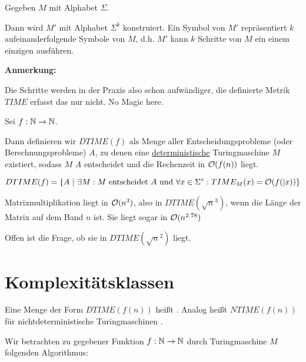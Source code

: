 \begin{beweis}
    Gegeben $M$ mit Alphabet $\Sigma$.

    Dann wird $M'$ mit Alphabet $\Sigma^k$ konstruiert. Ein Symbol von $M'$ repräsentiert $k$ aufeinanderfolgende Symbole von $M$, d.h. $M'$ kann $k$ Schritte von $M$ ein einem einzigen ausführen.
\end{beweis}

\textbf{Anmerkung:}

Die Schritte werden in der Praxis also schon aufwändiger, die definierte Metrik $TIME$ erfasst das nur nicht. No Magic here.



\begin{definition}
    Sei $f: \mathbb{N} \rightarrow \mathbb{N}$. 

    Dann definieren wir $DTIME(f)$ als Menge aller Entscheidungsprobleme (oder Berechnungsprobleme) $A$, zu denen eine \underline{deterministische} Turingmaschine $M$ existiert, sodass $M$ $A$ entscheidet und die Rechenzeit in $\mathcal{O}(f(n))$ liegt.

    $$ DTIME(f) = \{  
        A 
        \ |\ 
        \exists M: 
            M \text{ entscheidet } A
            \text{ und }
            \forall x \in \Sigma^\ast: TIME_M(x) = \bigO(f(|x))
    \}
    $$
\end{definition}

\begin{satz}
    Matrixmultiplikation liegt in $\mathcal{O}(n^3)$, also in $DTIME(\sqrt{n}^3)$, wenn die Länge der Matrix auf dem Band $n$ ist.
    Sie liegt sogar in $\mathcal{O}(n^{2.78})$
\end{satz}

Offen ist die Frage, ob sie in $DTIME(\sqrt{n}^2)$ liegt.



\section{Komplexitätsklassen}


\begin{definition}
    Eine Menge der Form $DTIME(f(n))$ heißt .
    Analog heißt $NTIME(f(n))$ für nichtdeterministische Turingmaschinen .
\end{definition}


Wir betrachten zu gegebener Funktion $f: \mathbb{N} \rightarrow \mathbb{N}$ durch Turingmaschine $M$ folgenden Algorithmus:

